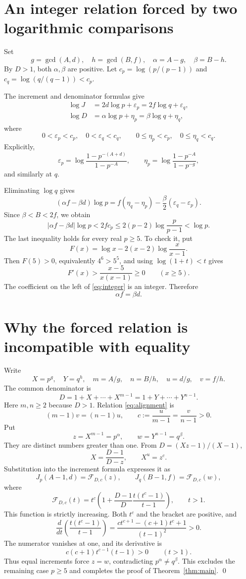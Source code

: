 \documentclass[11pt]{article}
\begin{document}
\section{An integer relation forced by two logarithmic comparisons}
Set
\[
 g=\gcd(A,d),\quad h=\gcd(B,f),\quad
 \alpha=A-g,\quad\beta=B-h.
\]
By $D>1$, both $\alpha,\beta$ are positive. Let $c_p=\log(p/(p-1))$ and $c_q=\log(q/(q-1))<c_p$.

The increment and denominator formulas give
\begin{align*}
 \log J&=2d\log p+\varepsilon_p=2f\log q+\varepsilon_q,\\
 \log D&=\alpha\log p+\eta_p=\beta\log q+\eta_q,
\end{align*}
where
\[
 0<\varepsilon_p<c_p,\quad 0<\varepsilon_q<c_q,
 \qquad 0\le\eta_p<c_p,\quad0\le\eta_q<c_q.
\]
Explicitly,
\[
 \varepsilon_p=\log\frac{1-p^{-(A+d)}}{1-p^{-A}},\qquad
 \eta_p=\log\frac{1-p^{-A}}{1-p^{-g}},
\]
and similarly at $q$.

Eliminating $\log q$ gives
\[
 (\alpha f-\beta d)\log p
 =f(\eta_q-\eta_p)-\frac\beta2(\varepsilon_q-\varepsilon_p).
\]
Since $\beta<B<2f$, we obtain
\begin{equation}\label{eq:integer}
 |\alpha f-\beta d|\log p<2f c_p
 \le2(p-2)\log\frac p{p-1}<\log p.
\end{equation}
The last inequality holds for every real $p\ge5$. To check it, put
\[
 F(x)=\log x-2(x-2)\log\frac{x}{x-1}.
\]
Then $F(5)>0$, equivalently $4^6>5^5$, and using $\log(1+t)<t$ gives
\[
 F'(x)>\frac{x-5}{x(x-1)}\ge0\qquad(x\ge5).
\]
The coefficient on the left of \eqref{eq:integer} is an integer. Therefore
\begin{equation}\label{eq:alignment}
 \boxed{\alpha f=\beta d.}
\end{equation}

\section{Why the forced relation is incompatible with equality}
Write
\[
 X=p^g,\quad Y=q^h,\quad
 m=A/g,\quad n=B/h,\quad
 u=d/g,\quad v=f/h.
\]
The common denominator is
\[
 D=1+X+\cdots+X^{m-1}=1+Y+\cdots+Y^{n-1}.
\]
Here $m,n\ge2$ because $D>1$. Relation \eqref{eq:alignment} is
\[
 (m-1)v=(n-1)u,
 \qquad c:=\frac{u}{m-1}=\frac{v}{n-1}>0.
\]
Put
\[
 z=X^{m-1}=p^\alpha,\qquad w=Y^{n-1}=q^\beta.
\]
They are distinct numbers greater than one. From $D=(Xz-1)/(X-1)$,
\[
 X=\frac{D-1}{D-z},\qquad X^u=z^c.
\]
Substitution into the increment formula expresses it as
\[
 J_p(A-1,d)=\mathcal F_{D,c}(z),\qquad
 J_q(B-1,f)=\mathcal F_{D,c}(w),
\]
where
\[
 \mathcal F_{D,c}(t)
 =t^c\left(1+\frac{D-1}{D}\frac{t(t^c-1)}{t-1}\right),\qquad t>1.
\]
This function is strictly increasing. Both $t^c$ and the bracket are positive, and
\[
 \frac{d}{dt}\left(\frac{t(t^c-1)}{t-1}\right)
 =\frac{c t^{c+1}-(c+1)t^c+1}{(t-1)^2}>0.
\]
The numerator vanishes at one, and its derivative is
\[
 c(c+1)t^{c-1}(t-1)>0\qquad(t>1).
\]
Thus equal increments force $z=w$, contradicting $p^\alpha\ne q^\beta$. This excludes the remaining case $p\ge5$ and completes the proof of Theorem~\ref{thm:main}. \qed
\end{document}
